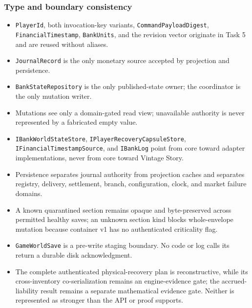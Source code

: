 \documentclass[
  10pt,
  letterpaper,
]{article}
\newcommand{\passthrough}[1]{#1}
\providecommand{\tightlist}{%
  \setlength{\itemsep}{0pt}\setlength{\parskip}{0pt}}
\begin{document}
\subsubsection{Type and boundary
consistency}\label{type-and-boundary-consistency}

\begin{itemize}
\tightlist
\item
  \passthrough{\lstinline!PlayerId!}, both invocation-key variants,
  \passthrough{\lstinline!CommandPayloadDigest!},
  \passthrough{\lstinline!FinancialTimestamp!},
  \passthrough{\lstinline!BankUnits!}, and the revision vector originate
  in Task 5 and are reused without aliases.
\item
  \passthrough{\lstinline!JournalRecord!} is the only monetary source
  accepted by projection and persistence.
\item
  \passthrough{\lstinline!BankStateRepository!} is the only
  published-state owner; the coordinator is the only mutation writer.
\item
  Mutations see only a domain-gated read view; unavailable authority is
  never represented by a fabricated empty value.
\item
  \passthrough{\lstinline!IBankWorldStateStore!},
  \texttt{IPlayerRecoveryCapsuleStore},
  \texttt{IFinancialTimestampSource}, and
  \passthrough{\lstinline!IBankLog!} point from core toward adapter
  implementations, never from core toward Vintage Story.
\item
  Persistence separates journal authority from projection caches and
  separates registry, delivery, settlement, branch, configuration,
  clock, and market failure domains.
\item
  A known quarantined section remains opaque and byte-preserved across
  permitted healthy saves; an unknown section kind blocks whole-envelope
  mutation because container v1 has no authenticated criticality flag.
\item
  \passthrough{\lstinline!GameWorldSave!} is a pre-write staging
  boundary. No code or log calls its return a durable disk
  acknowledgment.
\item
  The complete authenticated physical-recovery plan is reconstructive,
  while its cross-inventory co-serialization remains an engine-evidence
  gate; the accrued-liability result remains a separate mathematical
  evidence gate. Neither is represented as stronger than the API or
  proof supports.
\end{itemize}
\end{document}
